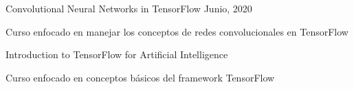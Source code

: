 \begin{cventries}
\cventry
{Convolutional Neural Networks in TensorFlow} %
{} %
{} %
{Junio, 2020} %
{
  \begin{cvitems} %
    \item {Curso enfocado en manejar los conceptos de redes convolucionales en TensorFlow}
  \end{cvitems}
}

\cventry
{Introduction to TensorFlow for Artificial Intelligence} %
{} %
{} %
{} %
{
  \begin{cvitems} %
    \item {Curso enfocado en conceptos básicos del framework TensorFlow}
  \end{cvitems}
}

\end{cventries}